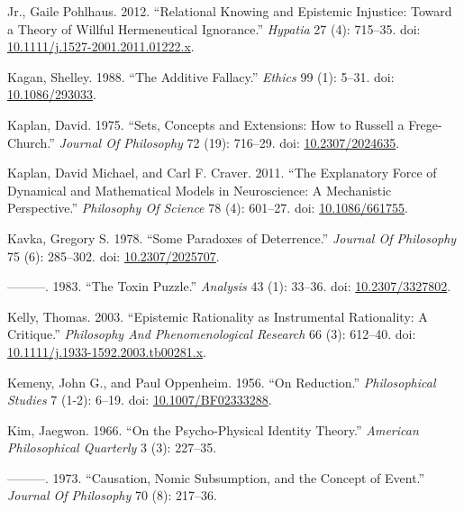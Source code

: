 \documentclass[
  10pt,
  letterpaper,
  DIV=11,
  numbers=noendperiod,
  twoside]{scrartcl}
\newlength{\cslhangindent}
\newenvironment{CSLReferences}[2] %
 {\begin{list}{}{%
  \setlength{\itemindent}{0pt}
  \setlength{\leftmargin}{0pt}
  \setlength{\parsep}{0pt}
  \ifodd #1
   \setlength{\leftmargin}{\cslhangindent}
   \setlength{\itemindent}{-1\cslhangindent}
  \fi
  \setlength{\itemsep}{#2\baselineskip}}}
 {\end{list}}
\begin{document}
\begin{CSLReferences}{1}{0}
Jr., Gaile Pohlhaus. 2012. {``Relational Knowing and Epistemic
Injustice: Toward a Theory of Willful Hermeneutical Ignorance.''}
\emph{Hypatia} 27 (4): 715--35. doi:
\href{https://doi.org/10.1111/j.1527-2001.2011.01222.x}{10.1111/j.1527-2001.2011.01222.x}.

Kagan, Shelley. 1988. {``The Additive Fallacy.''} \emph{Ethics} 99 (1):
5--31. doi: \href{https://doi.org/10.1086/293033}{10.1086/293033}.

Kaplan, David. 1975. {``Sets, Concepts and Extensions: How to Russell a
Frege-Church.''} \emph{Journal Of Philosophy} 72 (19): 716--29. doi:
\href{https://doi.org/10.2307/2024635}{10.2307/2024635}.

Kaplan, David Michael, and Carl F. Craver. 2011. {``The Explanatory
Force of Dynamical and Mathematical Models in Neuroscience: A
Mechanistic Perspective.''} \emph{Philosophy Of Science} 78 (4):
601--27. doi: \href{https://doi.org/10.1086/661755}{10.1086/661755}.

Kavka, Gregory S. 1978. {``Some Paradoxes of Deterrence.''}
\emph{Journal Of Philosophy} 75 (6): 285--302. doi:
\href{https://doi.org/10.2307/2025707}{10.2307/2025707}.

---------. 1983. {``The Toxin Puzzle.''} \emph{Analysis} 43 (1): 33--36.
doi: \href{https://doi.org/10.2307/3327802}{10.2307/3327802}.

Kelly, Thomas. 2003. {``Epistemic Rationality as Instrumental
Rationality: A Critique.''} \emph{Philosophy And Phenomenological
Research} 66 (3): 612--40. doi:
\href{https://doi.org/10.1111/j.1933-1592.2003.tb00281.x}{10.1111/j.1933-1592.2003.tb00281.x}.

Kemeny, John G., and Paul Oppenheim. 1956. {``On Reduction.''}
\emph{Philosophical Studies} 7 (1-2): 6--19. doi:
\href{https://doi.org/10.1007/BF02333288}{10.1007/BF02333288}.

Kim, Jaegwon. 1966. {``On the Psycho-Physical Identity Theory.''}
\emph{American Philosophical Quarterly} 3 (3): 227--35.

---------. 1973. {``Causation, Nomic Subsumption, and the Concept of
Event.''} \emph{Journal Of Philosophy} 70 (8): 217--36.


\end{CSLReferences}
\end{document}
